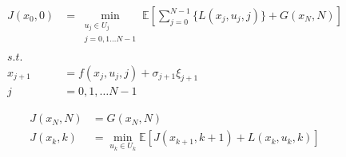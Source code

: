 \documentclass[varwidth]{standalone}
\begin{document}
\begin{minipage}{0.8\linewidth}
    \begin{align}
        J(x_0, 0) &= \min_{
            \substack{
                u_j \in U_j \\
                j = 0, 1 \dots N-1 \\
            }
        }
        \mathbb{E} \left[ \sum_{j=0}^{N-1} \{L(x_j, u_j, j)\} + G(x_N, N)\right] \nonumber\\
        s.t. &{} \\
        x_{j+1} &= f(x_j, u_j, j) + \sigma_{j+1}\xi_{j+1} \nonumber\\
        j &= 0, 1, \dots N-1 \nonumber
    \end{align}
\end{minipage}

\begin{minipage}{0.8\linewidth}
    \begin{align}
        J(x_N, N) &= G(x_N, N)  \\
        J(x_k, k) &= \min_{u_k \in U_k} \mathbb{E} \left[ 
            J(x_{k+1}, k+1) + L(x_k, u_k, k) 
        \right]
    \end{align}
\end{minipage}
\end{document}
